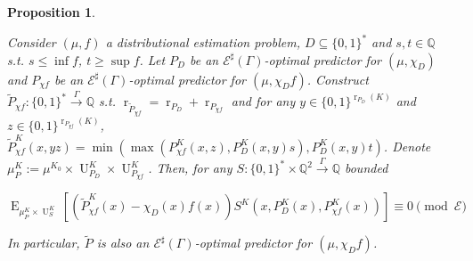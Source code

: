 \documentclass{article}
\numberwithin{equation}{section}
\theoremstyle{definition}
\theoremstyle{plain}
\newtheorem{proposition}{Proposition}[section]
\newcommand{\Bool}{\{0,1\}}
\newcommand{\Words}{{\Bool^*}}
\DeclareMathOperator{\E}{E}
\DeclareMathOperator{\R}{r}
\DeclareMathOperator{\Un}{U}
\newcommand{\Rats}{\mathbb{Q}}
\newcommand{\Fall}{\mathcal{E}}
\newcommand{\ESG}{\Fall^\sharp(\Gamma)}
\newcommand{\BoolR}[1]{\Bool^{\R_{#1}(K)}}
\newcommand{\Scheme}{\xrightarrow{\Gamma}}
\begin{document}
\begin{samepage}
\begin{proposition}
\label{prp:thm__cond__lemma}

Consider $(\mu, f)$ a distributional estimation problem, ${D \subseteq \Words}$ and $s, t \in \Rats$ s.t. $s \leq \inf f$, $t \geq \sup f$. Let $P_D$ be an $\ESG$-optimal predictor for $(\mu, \chi_D)$ and $P_{\chi f}$ be an $\ESG$-optimal predictor for $(\mu, \chi_D f)$. Construct $\tilde{P}_{\chi f}: \Words \Scheme \Rats$ s.t. $\R_{\tilde{P}_{\chi f}} = \R_{P_D} + \R_{P_{\chi f}}$ and for any ${y \in \BoolR{P_D}}$ and $z \in \BoolR{P_{\chi f}}$, ${\tilde{P}_{\chi f}^K(x,yz)=\min(\max(P_{\chi f}^K(x,z),P_D^K(x,y) s),P_D^K(x,y) t)}$. Denote $\mu_P^K:=\mu^{K_0} \times \Un_{P_D}^K \times \Un_{P_{\chi f}}^K$. Then, for any $S: \Words \times \Rats^2 \Scheme \Rats$ bounded

\begin{equation}
\E_{\mu_P^K \times \Un_S^K}[(\tilde{P}_{\chi f}^K(x)-\chi_D(x)f(x))S^K(x,P_D^K(x),P_{\chi f}^K(x))]  \equiv 0 \pmod \Fall
\end{equation}

In particular, $\tilde{P}$ is also an $\ESG$-optimal predictor for $(\mu, \chi_D f)$.

\end{proposition}
\end{samepage}
\end{document}
